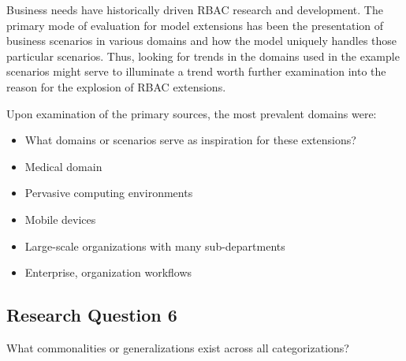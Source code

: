Business needs have historically driven RBAC research and development.  The primary mode of evaluation for
model extensions has been the presentation of business scenarios in various domains and how the model
uniquely handles those particular scenarios.  Thus, looking for trends in the domains used in the example
scenarios might serve to illuminate a trend worth further examination into the reason for the explosion of
RBAC extensions.

Upon examination of the primary sources, the most prevalent domains were:

\begin{itemize}
\item What domains or scenarios serve as inspiration for these extensions?
\item Medical domain
\item Pervasive computing environments
\item Mobile devices
\item Large-scale organizations with many sub-departments
\item Enterprise, organization workflows
\end{itemize}

\subsection{Research Question 6}

What commonalities or generalizations exist across all categorizations? \\
